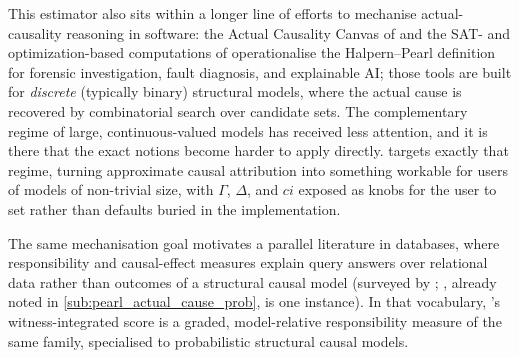 This estimator also sits within a longer line of efforts to mechanise
actual-causality reasoning in software: the Actual Causality Canvas of
\citet{ibrahimCanvas2020} and the SAT- and optimization-based computations of
\citet{ibrahimChecking2020} operationalise the Halpern--Pearl definition for
forensic investigation, fault diagnosis, and explainable AI; those tools are built
for \emph{discrete} (typically binary) structural models, where the actual cause is
recovered by combinatorial search over candidate sets. The complementary regime of large,
continuous-valued models has received less attention, and it is there that the exact
notions become harder to apply directly. \Ourapproach targets exactly that regime,
turning approximate causal attribution into something workable for users of models of
non-trivial size, with $\Gamma$, $\Delta$, and $ci$ exposed as knobs for the user to set
rather than defaults buried in the implementation.

The same mechanisation goal motivates a parallel literature in databases, where
responsibility and causal-effect measures explain query answers over relational
data rather than outcomes of a structural causal model (surveyed by
\citealp{bertossiAttributionScores2023}; \citealp{salimiQuantifyingCausalEffects2016},
already noted in \cref{sub:pearl_actual_cause_prob}, is one instance). In that
vocabulary, \ourapproach's witness-integrated score is a graded, model-relative
responsibility measure of the same family, specialised to probabilistic structural
causal models.
